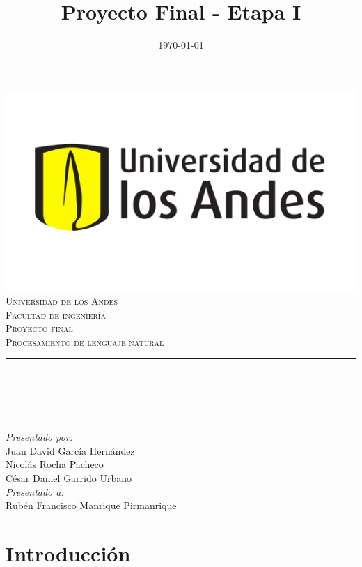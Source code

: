\documentclass[12pt]{article}
\title{Proyecto Final - Etapa I}
\date{\today}
\makeatletter
\let\thetitle\@title
\makeatother
\begin{document}
    \pagestyle{fancy}
    \fancyhf{}

    \renewcommand{\headrulewidth}{0.7pt}
\fancyfoot[R]{\thepage}

\begin{titlepage}
	\centering
    \includegraphics[scale = 0.45]{images/Logo.png}\\[0.5 cm]	%
    \textsc{\large Universidad de los Andes\\
        \vspace{0.2cm} 
        Facultad de ingeniería\\
        \vspace{0.3cm} 
        Proyecto final}\\[2.0 cm]	%
	\textsc{\Large Procesamiento de lenguaje natural}\\[0.5 cm]
	\rule{\linewidth}{0.2 mm} \\[0.4 cm]
	{ \LARGE \bfseries \thetitle}\\
	\rule{\linewidth}{0.2 mm} \\[1.5 cm]
	
	\large
			\emph{Presentado por:} \\
			Juan David García Hernández\\
			Nicolás Rocha Pacheco\\
			César Daniel Garrido Urbano\\
	\vfill
	\large
			\emph{Presentado a:}\\
			Rubén Francisco Manrique Pirmanrique\\
\end{titlepage}

\thispagestyle{empty}
\tableofcontents
\pagebreak

\setcounter{page}{1}
\section*{Introducción}







\end{document}
